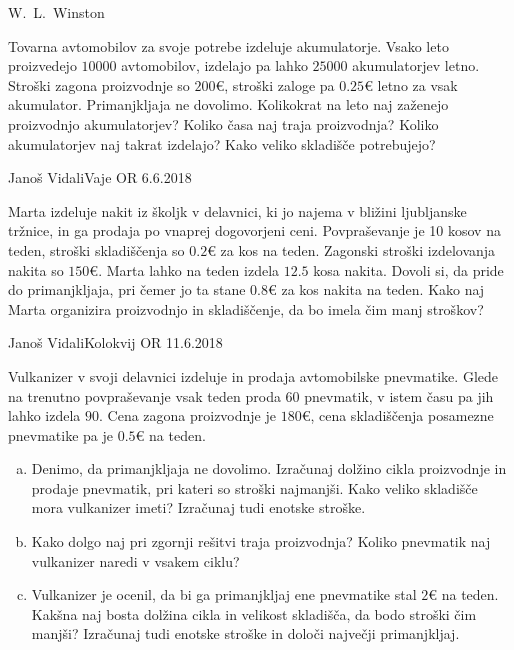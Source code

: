 \begin{naloga}{W.~L.~Winston}{\cite[\S15, Example~5]{w}}
\begin{vprasanje}
Tovarna avtomobilov za svoje potrebe izdeluje akumulatorje.
Vsako leto proizvedejo $10000$ avtomobilov,
izdelajo pa lahko $25000$ akumulatorjev letno.
Stroški zagona proizvodnje so $200 €$,
stroški zaloge pa $0.25 €$ letno za vsak akumulator.
Primanjkljaja ne dovolimo.
Kolikokrat na leto naj zaženejo proizvodnjo akumulatorjev?
Koliko časa naj traja proizvodnja?
Koliko akumulatorjev naj takrat izdelajo?
Kako veliko skladišče potrebujejo?
\end{vprasanje}
\begin{odgovor}
\end{odgovor}
\end{naloga}


\begin{naloga}{Janoš Vidali}{Vaje OR 6.6.2018}
\begin{vprasanje}
Marta izdeluje nakit iz školjk v delavnici,
ki jo najema v bližini ljubljanske tržnice,
in ga prodaja po vnaprej dogovorjeni ceni.
Povpraševanje je 10 kosov na teden,
stroški skladiščenja so $0.2 €$ za kos na teden.
Zagonski stroški izdelovanja nakita so $150 €$.
Marta lahko na teden izdela $12.5$ kosa nakita.
Dovoli si, da pride do primanjkljaja,
pri čemer jo ta stane $0.8 €$ za kos nakita na teden.
Kako naj Marta organizira proizvodnjo in skladiščenje,
da bo imela čim manj stroškov?
\end{vprasanje}
\begin{odgovor}
\end{odgovor}
\end{naloga}


\begin{naloga}{Janoš Vidali}{Kolokvij OR 11.6.2018}
\begin{vprasanje}
Vulkanizer v svoji delavnici izdeluje in prodaja avtomobilske pnevmatike.
Glede na trenutno povpraševanje vsak teden proda $60$ pnevmatik,
v istem času pa jih lahko izdela $90$.
Cena zagona proizvodnje je $180 €$,
cena skladiščenja posamezne pnevmatike pa je $0.5 €$ na teden.

\begin{enumerate}[(a)]
\item Denimo, da primanjkljaja ne dovolimo.
Izračunaj dolžino cikla pro\-iz\-vod\-nje in prodaje pnevmatik,
pri kateri so stroški najmanjši.
Kako veliko skladišče mora vulkanizer imeti?
Izračunaj tudi enotske stroške.

\item Kako dolgo naj pri zgornji rešitvi traja proizvodnja?
Koliko pnevmatik naj vulkanizer naredi v vsakem ciklu?

\item Vulkanizer je ocenil,
da bi ga primanjkljaj ene pnevmatike stal $2 €$ na teden.
Kakšna naj bosta dolžina cikla in velikost skladišča,
da bodo stroški čim manjši?
Izračunaj tudi enotske stroške in določi največji primanjkljaj.
\end{enumerate}
\end{vprasanje}
\begin{odgovor}
\end{odgovor}
\end{naloga}


